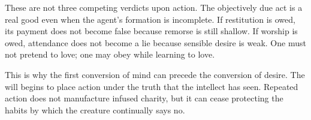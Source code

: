 These are not three competing verdicts upon action. The objectively due act is a real good even when the agent's formation is incomplete. If restitution is owed, its payment does not become false because remorse is still shallow. If worship is owed, attendance does not become a lie because sensible desire is weak. One must not pretend to love; one may obey while learning to love.

This is why the first conversion of mind can precede the conversion of desire. The will begins to place action under the truth that the intellect has seen. Repeated action does not manufacture infused charity, but it can cease protecting the habits by which the creature continually says no.
